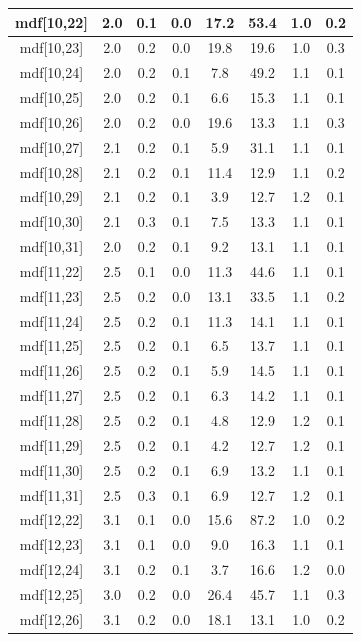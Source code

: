 \begin{longtable}{|c|c|c|c|c|c|c|c|}
\hline
mdf[10,22] & 2.0 & 0.1 & 0.0 & 17.2 & 53.4 & 1.0 & 0.2 \\
\hline
mdf[10,23] & 2.0 & 0.2 & 0.0 & 19.8 & 19.6 & 1.0 & 0.3 \\
\hline
mdf[10,24] & 2.0 & 0.2 & 0.1 & 7.8 & 49.2 & 1.1 & 0.1 \\
\hline
mdf[10,25] & 2.0 & 0.2 & 0.1 & 6.6 & 15.3 & 1.1 & 0.1 \\
\hline
mdf[10,26] & 2.0 & 0.2 & 0.0 & 19.6 & 13.3 & 1.1 & 0.3 \\
\hline
mdf[10,27] & 2.1 & 0.2 & 0.1 & 5.9 & 31.1 & 1.1 & 0.1 \\
\hline
mdf[10,28] & 2.1 & 0.2 & 0.1 & 11.4 & 12.9 & 1.1 & 0.2 \\
\hline
mdf[10,29] & 2.1 & 0.2 & 0.1 & 3.9 & 12.7 & 1.2 & 0.1 \\
\hline
mdf[10,30] & 2.1 & 0.3 & 0.1 & 7.5 & 13.3 & 1.1 & 0.1 \\
\hline
mdf[10,31] & 2.0 & 0.2 & 0.1 & 9.2 & 13.1 & 1.1 & 0.1 \\
\hline
mdf[11,22] & 2.5 & 0.1 & 0.0 & 11.3 & 44.6 & 1.1 & 0.1 \\
\hline
mdf[11,23] & 2.5 & 0.2 & 0.0 & 13.1 & 33.5 & 1.1 & 0.2 \\
\hline
mdf[11,24] & 2.5 & 0.2 & 0.1 & 11.3 & 14.1 & 1.1 & 0.1 \\
\hline
mdf[11,25] & 2.5 & 0.2 & 0.1 & 6.5 & 13.7 & 1.1 & 0.1 \\
\hline
mdf[11,26] & 2.5 & 0.2 & 0.1 & 5.9 & 14.5 & 1.1 & 0.1 \\
\hline
mdf[11,27] & 2.5 & 0.2 & 0.1 & 6.3 & 14.2 & 1.1 & 0.1 \\
\hline
mdf[11,28] & 2.5 & 0.2 & 0.1 & 4.8 & 12.9 & 1.2 & 0.1 \\
\hline
mdf[11,29] & 2.5 & 0.2 & 0.1 & 4.2 & 12.7 & 1.2 & 0.1 \\
\hline
mdf[11,30] & 2.5 & 0.2 & 0.1 & 6.9 & 13.2 & 1.1 & 0.1 \\
\hline
mdf[11,31] & 2.5 & 0.3 & 0.1 & 6.9 & 12.7 & 1.2 & 0.1 \\
\hline
mdf[12,22] & 3.1 & 0.1 & 0.0 & 15.6 & 87.2 & 1.0 & 0.2 \\
\hline
mdf[12,23] & 3.1 & 0.1 & 0.0 & 9.0 & 16.3 & 1.1 & 0.1 \\
\hline
mdf[12,24] & 3.1 & 0.2 & 0.1 & 3.7 & 16.6 & 1.2 & 0.0 \\
\hline
mdf[12,25] & 3.0 & 0.2 & 0.0 & 26.4 & 45.7 & 1.1 & 0.3 \\
\hline
mdf[12,26] & 3.1 & 0.2 & 0.0 & 18.1 & 13.1 & 1.0 & 0.2 \\

\end{longtable}
